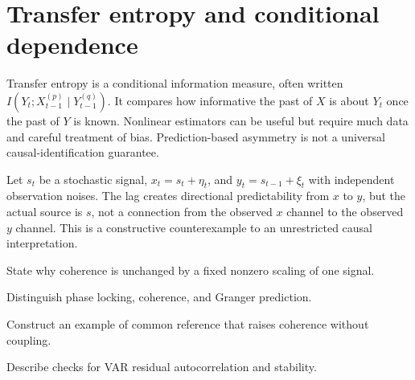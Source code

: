 \section{Transfer entropy and conditional dependence}
Transfer entropy is a conditional information measure, often written $I(Y_t;X_{t-1}^{(p)}\mid Y_{t-1}^{(q)})$. It compares how informative the past of $X$ is about $Y_t$ once the past of $Y$ is known. Nonlinear estimators can be useful but require much data and careful treatment of bias. Prediction-based asymmetry is not a universal causal-identification guarantee.

\begin{workedexample}
Let $s_t$ be a stochastic signal, $x_t=s_t+\eta_t$, and $y_t=s_{t-1}+\xi_t$ with independent observation noises. The lag creates directional predictability from $x$ to $y$, but the actual source is $s$, not a connection from the observed $x$ channel to the observed $y$ channel. This is a constructive counterexample to an unrestricted causal interpretation.
\end{workedexample}
\begin{exercises}
\item State why coherence is unchanged by a fixed nonzero scaling of one signal.
\item Distinguish phase locking, coherence, and Granger prediction.
\item Construct an example of common reference that raises coherence without coupling.
\item Describe checks for VAR residual autocorrelation and stability.
\end{exercises}